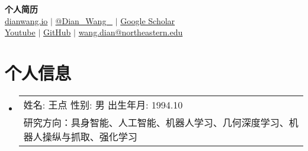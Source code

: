 \documentclass[letterpaper,12pt]{ctexart}
\newcommand{\resumeSubHeadingListStart}{\begin{itemize}[leftmargin=0.15in, label={}]}
\newcommand{\resumeSubHeadingListEnd}{\end{itemize}}
\begin{document}

\begin{center}
    \textbf{\large \scshape 个人简历} \\ \vspace{3pt}
    \small
    \faGlobe \hspace{.5pt} \href{https://dianwang.io}{dianwang.io}
    $|$
    \faTwitter \hspace{.5pt} \href{https://twitter.com/Dian_Wang_}{@Dian\_Wang\_}
    $|$
    \faGraduationCap \hspace{.5pt} \href{https://scholar.google.com/citations?user=CckjtfQAAAAJ&hl=en&authuser=1}{Google Scholar}
    \\
    \faYoutubePlay  \hspace{.5pt} \href{https://www.youtube.com/channel/UCsXEbqvtDnbtl_W01SYSeUQ}{Youtube}
    $|$
    \faGithub \hspace{.5pt} \href{https://github.com/pointW}{GitHub}
    $|$
    \faAt \hspace{.5pt} \href{mailto:wang.dian@northeastern.edu}{wang.dian@northeastern.edu}
\end{center}

\section{个人信息}
\resumeSubHeadingListStart
\item
\small
\begin{tabular*}{0.97\textwidth}[t]{p{}}
姓名: 王点 \hfill 性别: 男 \hfill 出生年月: 1994.10\\
研究方向：具身智能、人工智能、机器人学习、几何深度学习、机器人操纵与抓取、强化学习
\end{tabular*}
\resumeSubHeadingListEnd

\end{document}
